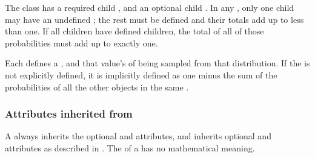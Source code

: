 The \Category class has a required \UncertValue child , and an optional \UncertValue child .  In any \CategoricalDistribution, only one child \Category may have an undefined ; the rest must be defined and their totals add up to less than one.  If all \Category children have defined  children, the total of all of those probabilities must add up to exactly one.

Each \Category defines a , and that value's  of being sampled from that distribution.  If the  is not explicitly defined, it is implicitly defined as one minus the sum of the probabilities of all the other \Category objects in the same \CategoricalDistribution.

\subsubsection{Attributes inherited from \SBase}

A \Category always inherits the optional  and  attributes, and inherits optional  and  attributes as described in .  The  of a \Category has no mathematical meaning.
